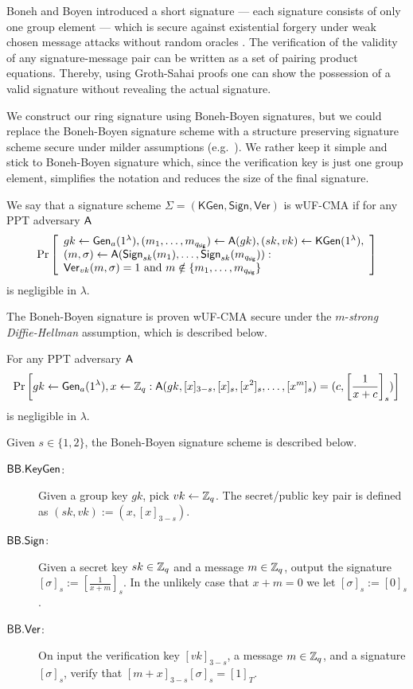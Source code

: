 

Boneh and Boyen introduced a short signature --- each signature consists of only one group element --- which is secure against existential forgery under weak chosen message attacks without random oracles \cite{EC:BonBoy04a}.
The verification of the validity of any signature-message pair can be written as a set of pairing product equations. Thereby, using Groth-Sahai proofs one can show the possession of a valid signature without revealing the actual signature.

We construct our ring signature using Boneh-Boyen signatures, but we could replace the Boneh-Boyen signature scheme with a structure preserving signature scheme secure under milder assumptions (e.g.~\cite{EPRINT:JutRoy17}). We rather keep it simple and stick to Boneh-Boyen signature which, since the verification key is just one group element, simplifies the notation and reduces the size of the final signature.
 
\begin{definition} We say that a signature scheme $\Sigma = (\mathsf{KGen},\mathsf{Sign},\mathsf{Ver})$ is wUF-CMA if for any PPT adversary $\mathsf{A}$
	$$
	\Pr\left[\begin{array}{l}
	gk \gets \mathsf{Gen}_a(1^\lambda), (m_1,\ldots,m_{q_\mathsf{sig}})\gets\mathsf{A}(gk), (sk,vk)\gets\mathsf{KGen}(1^\lambda), \\
	(m,\sigma)\gets\mathsf{A}(\mathsf{Sign}_{sk}(m_1),\ldots,\mathsf{Sign}_{sk}(m_{q_\mathsf{sig}})):\\
	\mathsf{Ver}_{vk}(m,\sigma)=1 \text{ and } m\notin \{m_1,\ldots,m_{q_\mathsf{sig}}\}
	\end{array}\right]
	$$
is negligible in $\lambda$.
\end{definition}

The Boneh-Boyen signature is proven wUF-CMA secure under the $m$-\emph{strong Diffie-Hellman} assumption, which is described below.

\begin{definition}
For any PPT adversary $\mathsf{A}$
$$
\Pr\left[gk\gets\mathsf{Gen}_a(1^\lambda),x\gets\mathbb{Z}_q:\mathsf{A}(gk,[x]_{3-s},[x]_s,[x^2]_s,\ldots,[x^m]_s)=(c,\left[\frac{1}{x+c}\right]_s)\right]
$$
is negligible in $\lambda$.
\end{definition}

Given $s\in\{1,2\}$, the Boneh-Boyen signature scheme is described below.

\begin{description}
\item[$\mathsf{BB}.\mathsf{KeyGen}$:] Given a group key $gk$, pick $vk\gets\mathbb{Z}_q$. The secret/public key pair is defined as $(sk,vk):=(x,[x]_{3-s})$.
\item[$\mathsf{BB}.\mathsf{Sign}$:] Given a secret key $sk\in\mathbb{Z}_q$ and a message $m\in\mathbb{Z}_q$, output the signature $[\sigma]_{s}:=\left[\frac{1}{x+m}\right]_{s}$. In the unlikely case that $x+m=0$ we let $[\sigma]_{s}:=[0]_{s}$.
\item[$\mathsf{BB}.\mathsf{Ver}$:] On input the verification key $[vk]_{3-s}$, a message $m\in\mathbb{Z}_q$, and a signature $[\sigma]_{s}$, verify that $[m+x]_{3-s}[\sigma]_{s}=[1]_T$.
\end{description} 

